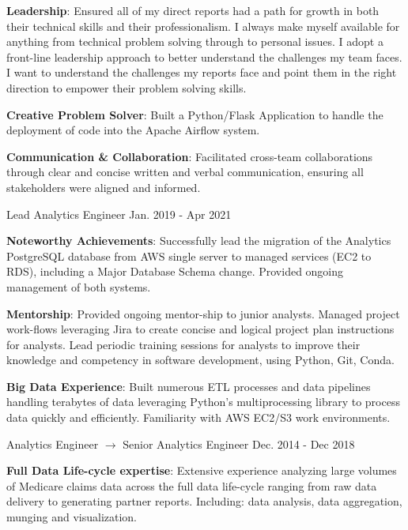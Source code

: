 \begin{cventries}
{\begin{cvitems}
{          \item {\textbf{Leadership}: Ensured all of my direct reports had a path for growth in both their technical skills and their professionalism. I always make myself available for anything from technical problem solving through to personal issues. I adopt a front-line leadership approach to better understand the challenges my team faces. I want to understand the challenges my reports face and point them in the right direction to empower their problem solving skills.}
          \item {\textbf{Creative Problem Solver}: Built a Python/Flask Application to handle the deployment of code into the Apache Airflow system.}
          \item {\textbf{Communication \& Collaboration}}: Facilitated cross-team collaborations through clear and concise written and verbal communication, ensuring all stakeholders were aligned and informed.}
      \end{cvitems}
    }
  \cventry
    {Lead Analytics Engineer}
    {}
    {}
    {Jan. 2019 - Apr 2021}
    {
      \begin{cvitems}
          \item {\textbf{Noteworthy Achievements}: Successfully lead the migration of the Analytics PostgreSQL database from AWS single server to managed services (EC2 to RDS), including a Major Database Schema change. Provided ongoing management of both systems.}
          \item {\textbf{Mentorship}: Provided ongoing mentor-ship to junior analysts. Managed project work-flows leveraging Jira to create concise and logical project plan instructions for analysts. Lead periodic training sessions for analysts to improve their knowledge and competency in software development, using Python, Git, Conda.}
          \item {\textbf{Big Data Experience}: Built numerous ETL processes and data pipelines handling terabytes of data leveraging Python's multiprocessing library to process data quickly and efficiently. Familiarity with AWS EC2/S3 work environments.}          
      \end{cvitems}
    }
  \cventry
    {Analytics Engineer $\rightarrow$ Senior Analytics Engineer}
    {}
    {}
    {Dec. 2014 - Dec 2018}
    {
      \begin{cvitems}
          \item {\textbf{Full Data Life-cycle expertise}: Extensive experience analyzing large volumes of Medicare claims data across the full data life-cycle ranging from raw data delivery to generating partner reports. Including: data analysis, data aggregation, munging and visualization.
}
\end{cvitems}}
\end{cventries}
